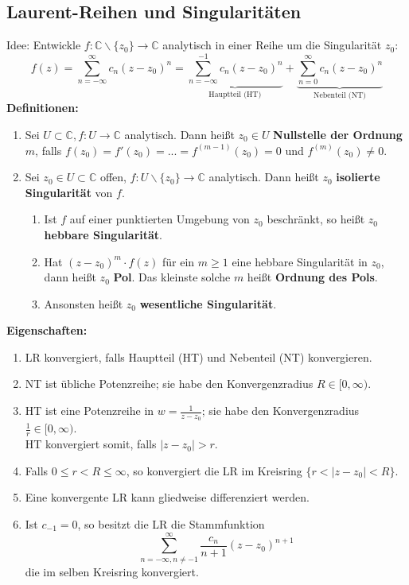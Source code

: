 \documentclass[a4paper,twocolumn,10pt]{article}
\begin{document}
\subsection{Laurent-Reihen und Singularitäten}
Idee: Entwickle $f:\mathbb{C}\backslash\{z_0\}\rightarrow\mathbb{C}$ analytisch in einer Reihe um die Singularität $z_0$:
\begin{equation*}
f(z)=\sum\limits_{n=-\infty}^{\infty}c_n(z-z_0)^n=\underbrace{\sum\limits_{n=-\infty}^{-1}c_n(z-z_0)^n}_{\text{Hauptteil (HT)}}+\underbrace{\sum\limits_{n=0}^{\infty}c_n(z-z_0)^n}_{\text{Nebenteil (NT)}}
\end{equation*}
\textbf{Definitionen:}
\begin{enumerate}[label=$\bullet$]
\item Sei $U\subset\mathbb{C},f:U\rightarrow\mathbb{C}$ analytisch. Dann heißt $z_0\in U$ \textbf{Nullstelle der Ordnung} $m$, falls $f(z_0)=f'(z_0)=...=f^{(m-1)}(z_0)=0$ und $f^{(m)}(z_0)\neq 0$.
\item Sei $z_0\in U\subset\mathbb{C}$ offen, $f:U\backslash\{z_0\}\rightarrow\mathbb{C}$ analytisch. Dann heißt $z_0$ \textbf{isolierte Singularität} von $f$.
\begin{enumerate}[label=-]
\item Ist $f$ auf einer punktierten Umgebung von $z_0$ beschränkt, so heißt $z_0$ \textbf{hebbare Singularität}.
\item Hat $(z-z_0)^m\cdot f(z)$ für ein $m\geq 1$ eine hebbare Singularität in $z_0$, dann heißt $z_0$ \textbf{Pol}. Das kleinste solche $m$ heißt \textbf{Ordnung des Pols}.
\item Ansonsten heißt $z_0$ \textbf{wesentliche Singularität}.
\end{enumerate}
\end{enumerate}
\textbf{Eigenschaften:}
\begin{enumerate}
\item LR konvergiert, falls Hauptteil (HT) und Nebenteil (NT) konvergieren.
\item NT ist übliche Potenzreihe; sie habe den Konvergenzradius $R\in[0,\infty)$.
\item HT ist eine Potenzreihe in $w=\frac{1}{z-z_0}$; sie habe den Konvergenzradius $\frac{1}{r}\in [0,\infty)$.\\
HT konvergiert somit, falls $|z-z_0|>r$.
\item Falls $0\leq r<R\leq\infty$, so konvergiert die LR im Kreisring $\{r<|z-z_0|<R\}$.
\item Eine konvergente LR kann gliedweise differenziert werden.
\item Ist $c_{-1}=0$, so besitzt die LR die Stammfunktion
\begin{equation*}
\sum\limits_{n=-\infty,n\neq -1}^{\infty}\frac{c_n}{n+1}(z-z_0)^{n+1}
\end{equation*}
die im selben Kreisring konvergiert.
\end{enumerate}
\end{document}
